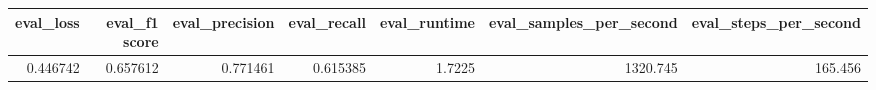 \begin{tabular}{rrrrrrr}
\toprule
 eval\_loss &  eval\_f1 score &  eval\_precision &  eval\_recall &  eval\_runtime &  eval\_samples\_per\_second &  eval\_steps\_per\_second \\
\midrule
  0.446742 &       0.657612 &        0.771461 &     0.615385 &        1.7225 &                 1320.745 &                165.456 \\
\bottomrule
\end{tabular}

